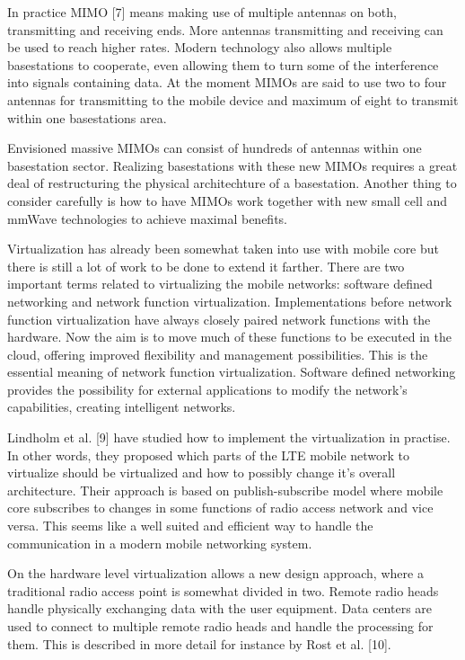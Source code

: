 \documentclass[conference]{IEEEtran}
\begin{document}
\par
In practice MIMO [7] means making use of multiple antennas on both, transmitting and receiving ends. More antennas transmitting and receiving can be used to reach higher rates. Modern technology also allows multiple basestations to cooperate, even allowing them to turn some of the interference into signals containing data. At the moment MIMOs are said to use two to four antennas for transmitting to the mobile device and maximum of eight to transmit within one basestations area.
\par
Envisioned massive MIMOs can consist of hundreds of antennas within one basestation sector. Realizing basestations with these new MIMOs requires a great deal of restructuring the physical architechture of a basestation. Another thing to consider carefully is how to have MIMOs work together with new small cell and mmWave technologies to achieve maximal benefits.
\par
Virtualization has already been somewhat taken into use with mobile core but there is still a lot of work to be done to extend it farther. There are two important terms related to virtualizing the mobile networks: software defined networking and network function virtualization. Implementations before network function virtualization have always closely paired network functions with the hardware. Now the aim is to move much of these functions to be executed in the cloud, offering improved flexibility and management possibilities. This is the essential meaning of network function virtualization. Software defined networking provides the possibility for external applications to modify the network's capabilities, creating intelligent networks.
\par
Lindholm et al. [9] have studied how to implement the virtualization in practise. In other words, they proposed which parts of the LTE mobile network to virtualize should be virtualized and how to possibly change it's overall architecture. Their approach is based on publish-subscribe model where mobile core subscribes to changes in some functions of radio access network and vice versa. This seems like a well suited and efficient way to handle the communication in a modern mobile networking system.
\par
On the hardware level virtualization allows a new design approach, where a traditional radio access point is somewhat divided in two. Remote radio heads handle physically exchanging data with the user equipment. Data centers are used to connect to multiple remote radio heads and handle the processing for them. This is described in more detail for instance by Rost et al. [10].
\end{document}

